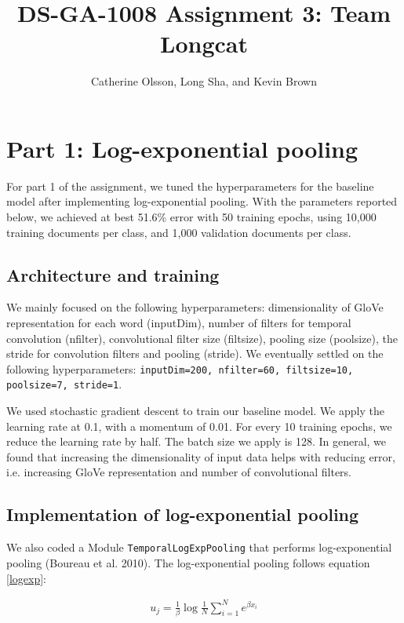 \documentclass{article}
\title{DS-GA-1008 Assignment 3: Team Longcat}
\author{Catherine Olsson, Long Sha, and Kevin Brown}
\begin{document}
 \maketitle

\section*{Part 1: Log-exponential pooling}

For part 1 of the assignment, we tuned the hyperparameters for the baseline model after implementing log-exponential pooling. With the parameters reported below, we achieved at best 51.6\% error with 50 training epochs, using 10,000 training documents per class, and 1,000 validation documents per class. 

\subsection*{Architecture and training}
We mainly focused on the following hyperparameters: dimensionality of GloVe representation for each word (inputDim), number of filters for temporal convolution (nfilter), convolutional filter size (filtsize), pooling size (poolsize), the stride for convolution filters and pooling (stride). We eventually settled on the following hyperparameters: \texttt{inputDim=200, nfilter=60, filtsize=10, poolsize=7, stride=1}.

We used stochastic gradient descent to train our baseline model. We apply the learning rate at 0.1, with a momentum of 0.01. For every 10 training epochs, we reduce the learning rate by half. The batch size we apply is 128. In general, we found that increasing the dimensionality of input data helps with reducing error, i.e. increasing GloVe representation and number of convolutional filters. 

\subsection*{Implementation of log-exponential pooling} 

We also coded a Module \texttt{TemporalLogExpPooling} that performs log-exponential pooling (Boureau et al. 2010). The log-exponential pooling follows equation \ref{logexp}:

\begin{align}
u_j = \frac{1}{\beta} \log{\frac{1}{N} \sum\limits_{i=1}^{N} e^{\beta x_i}}
\label{logexp}
\end{align}
\end{document}
